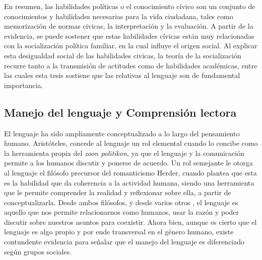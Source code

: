 \documentclass[12pt,twoside]{templates/facsothesis}
\begin{document}
En resumen, las habilidades políticas o el conocimiento cívico son un conjunto de conocimientos y habilidades necesarias para la vida ciudadana, tales como memorización de normas civicas, la interpretación y la evaluación. A partir de la evidencia, se puede sostener que estas habilidades cívicas están muy relacionadas con la socialización política familiar, en la cual influye el origen social. Al explicar esta desigualdad social de las habilidades civicas, la teoría de la socialización recurre tanto a la transmisión de actitudes como de habilidades académicas, entre las cuales esta tesis sostiene que las relativas al lenguaje son de fundamental importancia.

\hypertarget{manejo-del-lenguaje-y-comprensiuxf3n-lectora}{%
\subsection{Manejo del lenguaje y Comprensión lectora}\label{manejo-del-lenguaje-y-comprensiuxf3n-lectora}}

El lenguaje ha sido ampliamente conceptualizado a lo largo del pensamiento humano. Aristóteles, concede al lenguaje un rol elemental cuando lo concibe como la herramienta propia del \emph{zoon politikon}, ya que el lenguaje y la comunicación permite a los humanos discutir y ponerse de acuerdo. Un rol semejante le otorga al lenguaje el filósofo precursor del romanticismo Herder, cuando plantea que esta es la habilidad que da coherencia a la actividad humana, siendo una herramienta que le permite comprender la realidad y reflexionar sobre ella, a partir de conceptualizarla. Desde ambos filósofos, y desde varios otros \citep[ej.][]{echeverria_Ontologia_2011, garcia_LENGUAJE_2013}, el lenguaje es aquello que nos permite relacionarnos como humanos, usar la razón y poder discutir sobre nuestros asuntos para coexistir. Ahora bien, aunque es cierto que el lenguaje es algo propio y por ende transversal en el género humano, existe contundente evidencia para señalar que el manejo del lenguaje es diferenciado según grupos sociales.
\end{document}
